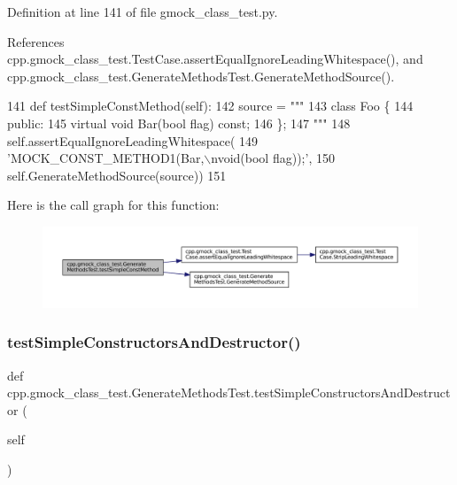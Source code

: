 Definition at line 141 of file gmock\+\_\+class\+\_\+test.\+py.



References cpp.\+gmock\+\_\+class\+\_\+test.\+Test\+Case.\+assert\+Equal\+Ignore\+Leading\+Whitespace(), and cpp.\+gmock\+\_\+class\+\_\+test.\+Generate\+Methods\+Test.\+Generate\+Method\+Source().


\begin{DoxyCode}
141   \textcolor{keyword}{def }testSimpleConstMethod(self):
142     source = \textcolor{stringliteral}{"""}
143 \textcolor{stringliteral}{class Foo \{}
144 \textcolor{stringliteral}{ public:}
145 \textcolor{stringliteral}{  virtual void Bar(bool flag) const;}
146 \textcolor{stringliteral}{\};}
147 \textcolor{stringliteral}{"""}
148     self.assertEqualIgnoreLeadingWhitespace(
149         \textcolor{stringliteral}{'MOCK\_CONST\_METHOD1(Bar,\(\backslash\)nvoid(bool flag));'},
150         self.GenerateMethodSource(source))
151 
\end{DoxyCode}
Here is the call graph for this function\+:
\nopagebreak
\begin{figure}[H]
\begin{center}
\leavevmode
\includegraphics[width=350pt]{classcpp_1_1gmock__class__test_1_1GenerateMethodsTest_ad8cb9c2f99fa65c7d3fee054dde0e30d_cgraph}
\end{center}
\end{figure}
\mbox{\label{classcpp_1_1gmock__class__test_1_1GenerateMethodsTest_abb0adf9fa7afd25d63964a9075af1414}} 
\subsubsection{\texorpdfstring{test\+Simple\+Constructors\+And\+Destructor()}{testSimpleConstructorsAndDestructor()}}
{\footnotesize\ttfamily def cpp.\+gmock\+\_\+class\+\_\+test.\+Generate\+Methods\+Test.\+test\+Simple\+Constructors\+And\+Destructor (\begin{DoxyParamCaption}\item[{}]{self }\end{DoxyParamCaption})}



